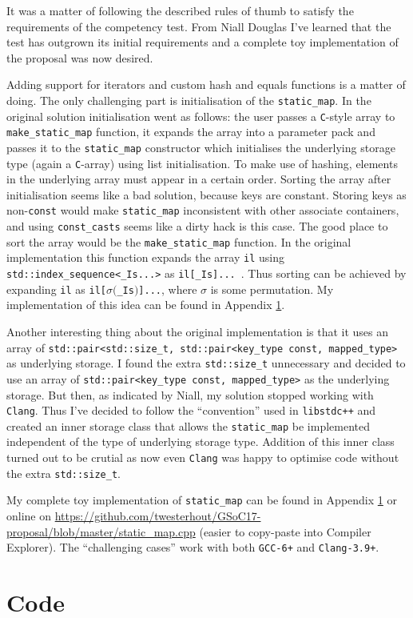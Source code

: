 \documentclass[a4paper,12pt]{article}
\begin{document}
    It was a matter of following the described rules of thumb to satisfy the requirements of the competency test. From Niall Douglas I've learned that the test has outgrown its initial requirements and a complete toy implementation of the proposal was now desired.

    Adding support for iterators and custom hash and equals functions is a matter of doing. The only challenging part is initialisation of the \texttt{static\_map}. In the original solution initialisation went as follows: the user passes a \texttt{C}-style array to \texttt{make\_static\_map} function, it expands the array into a parameter pack and passes it to the \texttt{static\_map} constructor which initialises the underlying storage type (again a \texttt{C}-array) using list initialisation. To make use of hashing, elements in the underlying array must appear in a certain order. Sorting the array after initialisation seems like a bad solution, because keys are constant. Storing keys as non-\texttt{const} would make \texttt{static\_map} inconsistent with other associate containers, and using \texttt{const\_casts} seems like a dirty hack is this case. The good place to sort the array would be the \texttt{make\_static\_map} function. In the original implementation this function expands the array \texttt{il} using \texttt{std::index\_sequence<\_Is...>} as \texttt{il[\_Is]...}\ . Thus sorting can be achieved by expanding \texttt{il} as \texttt{il[}$\sigma($\texttt{\_Is}$)$\texttt{]...}, where $\sigma$ is some permutation. My implementation of this idea can be found in Appendix \ref{competency-code}.

    Another interesting thing about the original implementation is that it uses an array of \texttt{std::pair<std::size\_t, std::pair<key\_type const, mapped\_type>} as underlying storage. I found the extra \texttt{std::size\_t} unnecessary and decided to use an array of \texttt{std::pair<key\_type const, mapped\_type>} as the underlying storage. But then, as indicated by Niall, my solution stopped working with \texttt{Clang}. Thus I've decided to follow the ``convention'' used in \texttt{libstdc++} and created an inner storage class that allows the \texttt{static\_map} be implemented independent of the type of underlying storage type. Addition of this inner class turned out to be crutial as now even \texttt{Clang} was happy to optimise code without the extra \texttt{std::size\_t}.

    My complete toy implementation of \texttt{static\_map} can be found in Appendix \ref{competency-code} or online on \url{https://github.com/twesterhout/GSoC17-proposal/blob/master/static_map.cpp} (easier to copy-paste into Compiler Explorer). The ``challenging cases'' work with both \texttt{GCC-6+} and \texttt{Clang-3.9+}.

\newpage
\appendix
\section{Code} \label{competency-code}
    \begin{spacing}{0.8}
    
    \end{spacing}
\end{document}
